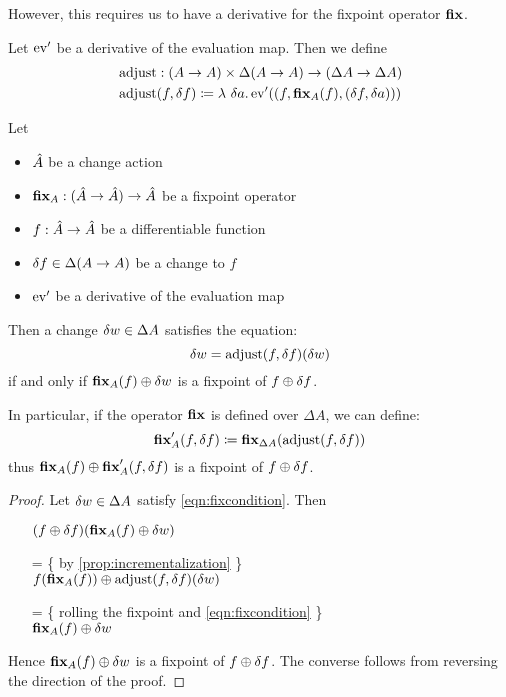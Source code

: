 However, this requires us to have a derivative for the fixpoint operator $\textbf{fix}$.

\begin{defn}
  Let $\operatorname{ev}'$ be a derivative of the evaluation map. Then we define
  \begin{align*}
    &\operatorname{adjust} : (A \rightarrow A) \times \Delta (A \rightarrow A) \rightarrow (\Delta A \rightarrow \Delta A)\\
    &\operatorname{adjust}(f, \delta f) \coloneqq \lambda\ \delta a . \operatorname{ev}'((f,
    \textbf{fix}_A(f), (\delta f, \delta a)))
  \end{align*}
\end{defn}

\begin{thm}
\label{thm:fixpointDiff}
  Let 
  \begin{itemize}
    \item $\hat{A}$ be a change action
    \item$\textbf{fix}_A : (\hat{A} \rightarrow \hat{A}) \rightarrow \hat{A}$ be a fixpoint operator
    \item $f: \hat{A} \rightarrow \hat{A}$ be a differentiable function
    \item $\delta f \in \Delta (A \rightarrow A)$ be a change to $f$
    \item $\operatorname{ev}'$ be a derivative of the evaluation map
  \end{itemize}

  Then a change $\delta w \in \Delta A$ satisfies
  the equation:
  \begin{equation}\label{eqn:fixcondition}
    \delta w = \operatorname{adjust}(f, \delta f)(\delta w)
  \end{equation}
  if and only if $\textbf{fix}_A(f) \oplus \delta w$ is a fixpoint of $f \oplus \delta f$.
  
  In particular, if the operator $\textbf{fix}$ is defined over $\Delta A$, we can define:
  $$
  \textbf{fix}_A'(f, \delta f) \coloneqq \textbf{fix}_{\Delta A}(\operatorname{adjust}(f, \delta f))
  $$
  thus $\textbf{fix}_A(f) \oplus \textbf{fix}_A'(f, \delta f)$ is a fixpoint 
  of $f \oplus \delta f$.
\end{thm}
\ifproofs
\begin{proof}
  Let $\delta w \in \Delta A$ satisfy \cref{eqn:fixcondition}. Then
  \begin{itemize}
  \item[ ]
    $
    (f \oplus \delta f)(\textbf{fix}_A(f) \oplus \delta w)
    $
  \item[=]\{ by \cref{prop:incrementalization} \}\\
    $
    f(\textbf{fix}_A(f))
    \oplus
    \operatorname{adjust}(f, \delta f)(\delta w)
    $
  \item[=]\{ rolling the fixpoint and \cref{eqn:fixcondition} \}\\
    $
    \textbf{fix}_A(f)
    \oplus
    \delta w
    $
  \end{itemize}
  Hence $\textbf{fix}_A(f) \oplus \delta w$ is a fixpoint of $f \oplus \delta f$. The converse
  follows from reversing the direction of the proof.
\end{proof}
\fi

